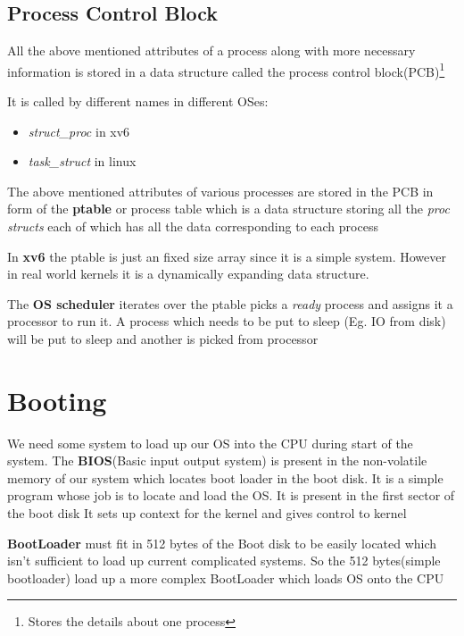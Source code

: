 \documentclass[12pt]{article}
\newcommand{\tbox}[1]{\noindent\fbox{\parbox{\textwidth}{#1}}}
\begin{document}
    \subsection{Process Control Block}
    All the above mentioned attributes of a process along with more necessary information
    is stored in a data structure called the process control block(PCB)\footnote{Stores the details about one process}


    It is called by different names in different OSes:
    \begin{itemize}[topsep=0pt, partopsep=0pt, itemsep=0pt, parsep=0pt]
        \item \textit{struct\_proc} in xv6
        \item \textit{task\_struct} in linux
    \end{itemize}


    The above mentioned attributes of various processes are stored in the PCB 
    in form of the \textbf{ptable} or process table which is a data structure storing all the 
    \textit{proc structs} each of which has all the data corresponding to each process

    In \textbf{xv6} the ptable is just an fixed size array since it is a simple system. However in real
    world kernels it is a dynamically expanding data structure. 

    
    The \textbf{OS scheduler} iterates over the ptable picks a \textit{ready} process and assigns it a processor to run it.
    A process which needs to be put to sleep (Eg. IO from disk) will be put to sleep and another is picked from processor
 
    \section{Booting}
    We need some system to load up our OS into the CPU during start of the system.
    The \textbf{BIOS}(Basic input output system) is present in the non-volatile memory of our system which locates boot loader 
    in the boot disk. It is a simple program whose job is to locate and load the OS. It is present in the first sector of the boot disk
    It sets up context for the kernel and gives control to kernel


    \textbf{BootLoader} must fit in 512 bytes of the Boot disk to be easily located which isn't sufficient to load up current complicated systems.
    So the 512 bytes(simple bootloader) load up a more complex BootLoader which loads OS onto the CPU 
\newpage
\noindent\tbox{
    \begin{center}
    \textbf{\Huge Lecture 3}
    \end{center}
}
\end{document}
